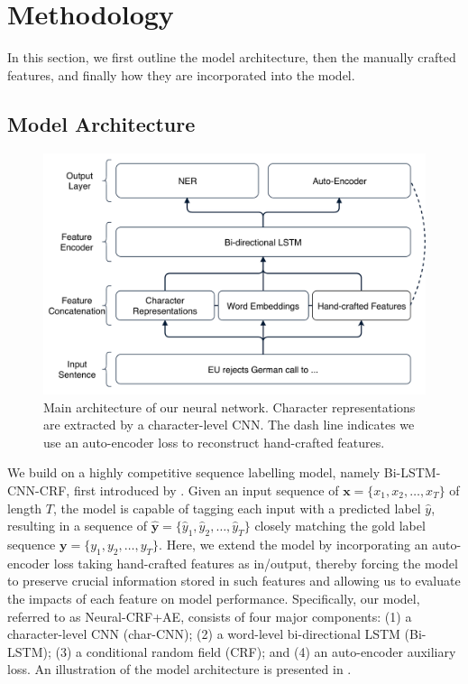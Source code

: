 \section{Methodology}

In this section, we first outline the model architecture, then the manually crafted features, and finally how they are  incorporated into the model.

\subsection{Model Architecture}
\begin{figure}[tb]
\centering
\includegraphics[width=\columnwidth]{model}
\caption{Main architecture of our neural network. Character representations are extracted by a character-level CNN. The dash line indicates we use an auto-encoder loss to reconstruct hand-crafted features.}
\label{figure1}
\end{figure}

We build on a highly competitive sequence labelling model, namely Bi-LSTM-CNN-CRF, first introduced by . 
Given an input sequence of $\mathbf{x} = \{x_{1}, x_2, \ldots, x_T\}$ of length $T$, the model is capable of tagging each input with a predicted label $\hat{y}$, resulting in a sequence of $\hat{\mathbf{y}} = \{\hat{y}_1, \hat{y}_2, \ldots, \hat{y}_T\}$ closely matching the gold label sequence $\mathbf{y} = \{y_1, y_2, \ldots, y_T\}$. 
Here, we extend the model by incorporating an auto-encoder loss taking hand-crafted features as in/output, thereby forcing the model to preserve crucial information stored in such features and allowing us to evaluate the impacts of each feature on model performance. 
Specifically, our model, referred to as Neural-CRF+AE, consists of four major components: (1) a character-level CNN (char-CNN); (2) a word-level bi-directional LSTM (Bi-LSTM); (3) a conditional random field (CRF); and (4) an auto-encoder auxiliary loss. 
An illustration of the model architecture is presented in .

